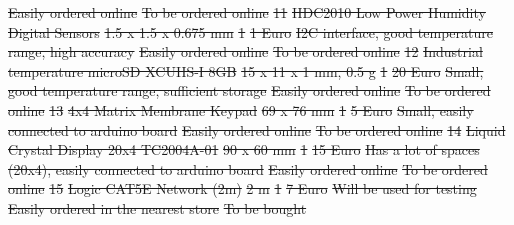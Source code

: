 \documentclass[a4paper,12pt,twoside]{article}
\providecommand{\DIFdeltex}[1]{{\protect\color{red}\sout{#1}}}                      %
\providecommand{\DIFdelend}{} %
\providecommand{\DIFdel}[1]{\texorpdfstring{\DIFdeltex{#1}}{}} %
\DeclareRobustCommand{\DIFdelend}{\DIFOaddend \let\includegraphics\DIFOincludegraphics} %
\begin{document}
\begin{landscape}
\DIFdel{Easily ordered online }%
\DIFdel{To be ordered online }%
\DIFdel{11 }%
\DIFdel{HDC2010 Low Power Humidity Digital Sensors }%
\DIFdel{1.5 x 1.5 x 0.675 mm }%
\DIFdel{1 }%
\DIFdel{1 Euro }%
\DIFdel{I2C interface, good temperature range, high accuracy }%
\DIFdel{Easily ordered online }%
\DIFdel{To be ordered online }%
\DIFdel{12 }%
\DIFdel{Industrial temperature microSD XCUHS-I 8GB }%
\DIFdel{15 x 11 x 1 mm, 0.5 g }%
\DIFdel{1 }%
\DIFdel{20 Euro }%
\DIFdel{Small, good temperature range, sufficient storage }%
\DIFdel{Easily ordered online }%
\DIFdel{To be ordered online }%
\DIFdel{13 }%
\DIFdel{4x4 Matrix Membrane Keypad }%
\DIFdel{69 x 76 mm }%
\DIFdel{1 }%
\DIFdel{5 Euro }%
\DIFdel{Small, easily connected to arduino board }%
\DIFdel{Easily ordered online }%
\DIFdel{To be ordered online }%
\DIFdel{14 }%
\DIFdel{Liquid Crystal Display 20x4 TC2004A-01 }%
\DIFdel{90 x 60 mm }%
\DIFdel{1 }%
\DIFdel{15 Euro }%
\DIFdel{Has a lot of spaces (20x4), easily connected to arduino board }%
\DIFdel{Easily ordered online }%
\DIFdel{To be ordered online }%
\DIFdel{15 }%
\DIFdel{Logic CAT5E Network (2m) }%
\DIFdel{2 m }%
\DIFdel{1 }%
\DIFdel{7 Euro }%
\DIFdel{Will be used for testing }%
\DIFdel{Easily ordered in the nearest store }%
\DIFdel{To be bought }%
\DIFdelend %


\end{landscape}
\end{document}
